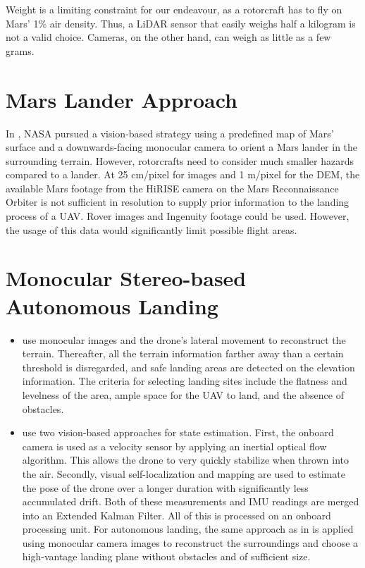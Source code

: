 Weight is a limiting constraint for our endeavour, as a rotorcraft has to fly on Mars' 1\% air density. Thus, a LiDAR sensor that easily weighs half a kilogram is not a valid choice. Cameras, on the other hand, can weigh as little as a few grams.

\section{Mars Lander Approach}

In \citep{Johnson2020Mars2020}, NASA pursued a vision-based strategy using a predefined map of Mars' surface and a downwards-facing monocular camera to orient a Mars lander in the surrounding terrain. However, rotorcrafts need to consider much smaller hazards compared to a lander. At 25 cm/pixel for images and 1 m/pixel for the DEM, the available Mars footage from the HiRISE camera on the Mars Reconnaissance Orbiter is not sufficient in resolution to supply prior information to the landing process of a UAV. Rover images and Ingenuity footage could be used. However, the usage of this data would significantly limit possible flight areas.


\section{Monocular Stereo-based Autonomous Landing}

\begin{itemize}
    \item \citet{Desaraju2015VisionBased} use monocular images and the drone's lateral movement to reconstruct the terrain. Thereafter, all the terrain information farther away than a certain threshold is disregarded, and safe landing areas are detected on the elevation information. The criteria for selecting landing sites include the flatness and levelness of the area, ample space for the UAV to land, and the absence of obstacles.
    \item \citet{Brockers2014TowardsAutonomous} use two vision-based approaches for state estimation. First, the onboard camera is used as a velocity sensor by applying an inertial optical flow algorithm. This allows the drone to very quickly stabilize when thrown into the air. Secondly, visual self-localization and mapping are used to estimate the pose of the drone over a longer duration with significantly less accumulated drift. Both of these measurements and IMU readings are merged into an Extended Kalman Filter. All of this is processed on an onboard processing unit. For autonomous landing, the same approach as in \citep{Desaraju2015VisionBased} is applied using monocular camera images to reconstruct the surroundings and choose a high-vantage landing plane without obstacles and of sufficient size.
\end{itemize}

